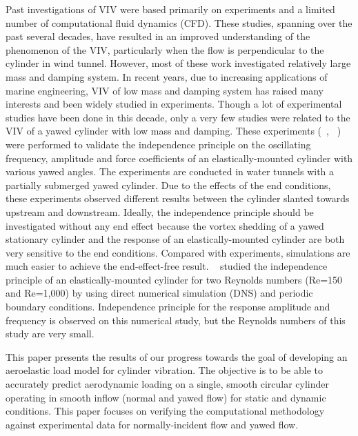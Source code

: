 Past investigations of VIV were based primarily on experiments and a limited
number of computational fluid dynamics (CFD). These studies, spanning over the
past several decades, have resulted in an improved understanding of the
phenomenon of the VIV, particularly when the flow is perpendicular to the
cylinder in wind tunnel.  However, most of these work investigated relatively
large mass and damping system.  In recent years, due to increasing applications
of marine engineering, VIV of low mass and damping system has raised many
interests and been widely studied in experiments. Though a lot of experimental
studies have been done in this decade, only a very few studies were related to
the VIV of a yawed cylinder with low mass and damping.  These experiments
(~\cite{jain2013vortex}, ~\cite{franzini2013one}) were performed to validate
the independence principle on the oscillating frequency, amplitude and force
coefficients of an elastically-mounted cylinder with various yawed angles. The
experiments are conducted in water tunnels with a partially submerged yawed
cylinder. Due to the effects of the end conditions, these experiments observed
different results between the cylinder slanted towards upstream and downstream.
Ideally, the independence principle should be investigated without any end
effect because the vortex shedding of a yawed stationary cylinder and the
response of an elastically-mounted cylinder are both very sensitive to the end
conditions. Compared with experiments, simulations are much easier to achieve
the end-effect-free result.  ~\cite{zhao2015validity} studied the independence
principle of an elastically-mounted cylinder for two Reynolds numbers (Re=150
and Re=1,000) by using direct numerical simulation (DNS) and periodic boundary
conditions.  Independence principle for the response amplitude and frequency is
observed on this numerical study, but the Reynolds numbers of this study are
very small.
	
This paper presents the results of our progress towards the goal of developing
an aeroelastic load model for cylinder vibration. The objective is to be able
to accurately predict aerodynamic loading on a single, smooth circular cylinder
operating in smooth inflow (normal and yawed flow) for static and dynamic
conditions. This paper focuses on verifying the computational methodology
against experimental data for normally-incident flow and yawed flow.

